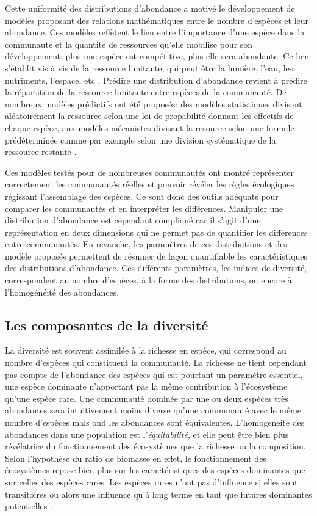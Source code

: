 \documentclass[
  11pt,
  french,
  A4paper,
  extrafontsizes,onecolumn,openright
  ]{memoir}
\begin{document}
Cette uniformité des distributions d'abondance a motivé le développement
de modèles proposant des relations mathématiques entre le nombre
d'espèces et leur abondance. Ces modèles reflètent le lien entre
l'importance d'une espèce dans la communauté et la quantité de
ressources qu'elle mobilise pour son développement: plus une espèce est
compétitive, plus elle sera abondante. Ce lien s'établit vis à vis de la
ressource limitante, qui peut être la lumière, l'eau, les nutriments,
l'espace, etc \autocites{Silvertown2004}{terSteege2006}. Prédire une
distribution d'abondance revient à prédire la répartition de la
ressource limitante entre espèces de la communauté. De nombreux modèles
prédictifs ont été proposés: des modèles statistiques divisant
aléatoirement la ressource selon une loi de propabilité donnant les
effectifs de chaque espèce, aux modèles mécanistes divisant la resource
selon une formule prédéterminée comme par exemple selon une division
systématique de la ressource restante
\autocites{Fisher1943}{Motomura1932}{Tokeshi1993}{Magurran1988}.

Ces modèles testés pour de nombreuses communautés ont montré représenter
correctement les communautés réelles et pouvoir révéler les règles
écologiques régissant l'assemblage des espèces. Ce sont donc des outils
adéquats pour comparer les communautés et en interpréter les
différences. Manipuler une distribution d'abondance est cependant
compliqué car il s'agit d'une représentation en deux dimensions qui ne
permet pas de quantifier les différences entre communautés. En revanche,
les paramètres de ces distributions et des modèle proposés permettent de
résumer de façon quantifiable les caractéristiques des distributions
d'abondance. Ces différents paramètres, les indices de diversité,
correspondent au nombre d'espèces, à la forme des distributions, ou
encore à l'homogénéité des abondances.

\subsection{Les composantes de la
diversité}\label{les-composantes-de-la-diversite}

La diversité est souvent assimilée à la richesse en espèce, qui
correspond au nombre d'espèces qui constituent la communauté. La
richesse ne tient cependant pas compte de l'abondance des espèces qui
est pourtant un paramètre essentiel, une espèce dominante n'apportant
pas la même contribution à l'écosystème qu'une espèce rare. Une
communauté dominée par une ou deux espèces très abondantes sera
intuitivement moins diverse qu'une communauté avec le même nombre
d'espèces mais ond les abondances sont équivalentes. L'homogeneité des
abondances dans une population est l'\emph{équitabilité}, et elle peut
être bien plus révélatrice du fonctionnement des écosystèmes que la
richesse ou la composition. Selon l'hypothèse du ratio de biomasse en
effet, le fonctionnement des écosystèmes repose bien plus sur les
caractéristiques des espèces dominantes que sur celles des espèces
rares. Les espèces rares n'ont pas d'influence si elles sont
transitoires ou alors une influence qu'à long terme en tant que futures
dominantes potentielles \autocite{Grime1998}.
\end{document}
